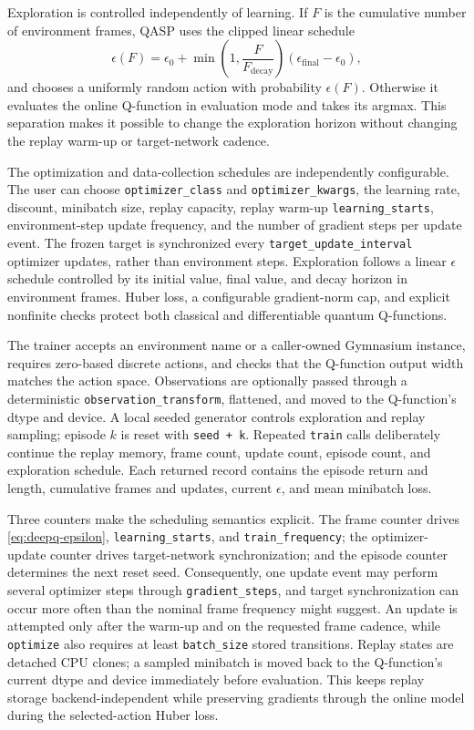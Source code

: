 \documentclass[10pt]{article}
\newcommand{\code}[1]{\texttt{#1}}
\begin{document}
Exploration is controlled independently of learning.  If $F$ is the cumulative
number of environment frames, QASP uses the clipped linear schedule
\begin{equation}
  \epsilon(F)=\epsilon_{0}+
  \min\!\left(1,\frac{F}{F_{\mathrm{decay}}}\right)
  (\epsilon_{\mathrm{final}}-\epsilon_{0}),
  \label{eq:deepq-epsilon}
\end{equation}
and chooses a uniformly random action with probability $\epsilon(F)$.
Otherwise it evaluates the online Q-function in evaluation mode and takes its
argmax.  This separation makes it possible to change the exploration horizon
without changing the replay warm-up or target-network cadence.

The optimization and data-collection schedules are independently
configurable.  The user can choose \code{optimizer\_class} and
\code{optimizer\_kwargs}, the learning rate, discount, minibatch size, replay
capacity, replay warm-up \code{learning\_starts}, environment-step update
frequency, and the number of gradient steps per update event.  The frozen
target is synchronized every \code{target\_update\_interval} optimizer
updates, rather than environment steps.  Exploration follows a linear
$\epsilon$ schedule controlled by its initial value, final value, and decay
horizon in environment frames.  Huber loss, a configurable gradient-norm cap,
and explicit nonfinite checks protect both classical and differentiable
quantum Q-functions.

The trainer accepts an environment name or a caller-owned Gymnasium instance,
requires zero-based discrete actions, and checks that the Q-function output
width matches the action space.  Observations are optionally passed through a
deterministic \code{observation\_transform}, flattened, and moved to the
Q-function's dtype and device.  A local seeded generator controls exploration
and replay sampling; episode $k$ is reset with \code{seed + k}.  Repeated
\code{train} calls deliberately continue the replay memory, frame count,
update count, episode count, and exploration schedule.  Each returned record
contains the episode return and length, cumulative frames and updates,
current $\epsilon$, and mean minibatch loss.

Three counters make the scheduling semantics explicit.  The frame counter
drives \cref{eq:deepq-epsilon}, \code{learning\_starts}, and
\code{train\_frequency}; the optimizer-update counter drives target-network
synchronization; and the episode counter determines the next reset seed.
Consequently, one update event may perform several optimizer steps through
\code{gradient\_steps}, and target synchronization can occur more often than
the nominal frame frequency might suggest.  An update is attempted only after
the warm-up and on the requested frame cadence, while \code{optimize} also
requires at least \code{batch\_size} stored transitions.  Replay states are
detached CPU clones; a sampled minibatch is moved back to the Q-function's
current dtype and device immediately before evaluation.  This keeps replay
storage backend-independent while preserving gradients through the online
model during the selected-action Huber loss.
\end{document}
